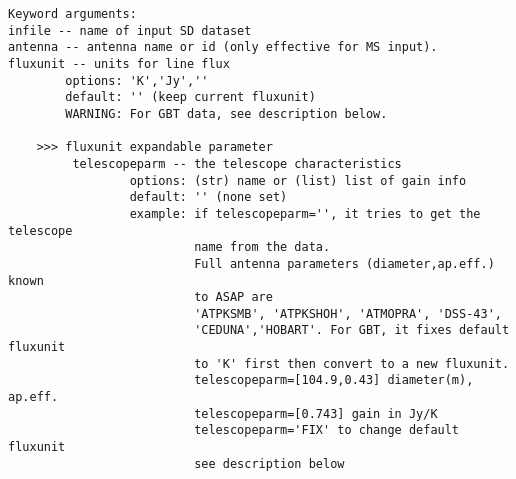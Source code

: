 \begin{verbatim}
Keyword arguments:
infile -- name of input SD dataset
antenna -- antenna name or id (only effective for MS input). 
fluxunit -- units for line flux
        options: 'K','Jy',''
        default: '' (keep current fluxunit)
        WARNING: For GBT data, see description below.

    >>> fluxunit expandable parameter
         telescopeparm -- the telescope characteristics
                 options: (str) name or (list) list of gain info
                 default: '' (none set)
                 example: if telescopeparm='', it tries to get the telescope
                          name from the data.
                          Full antenna parameters (diameter,ap.eff.) known
                          to ASAP are
                          'ATPKSMB', 'ATPKSHOH', 'ATMOPRA', 'DSS-43',
                          'CEDUNA','HOBART'. For GBT, it fixes default fluxunit
                          to 'K' first then convert to a new fluxunit.
                          telescopeparm=[104.9,0.43] diameter(m), ap.eff.
                          telescopeparm=[0.743] gain in Jy/K
                          telescopeparm='FIX' to change default fluxunit
                          see description below


\end{verbatim}
